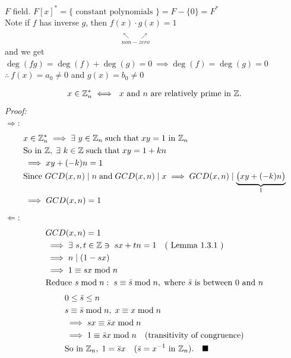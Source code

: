 \begin{example}
    $F$ field. $F[x]^* = \{\text{ constant polynomials }\} = F-\{0\}=F^*$ \\ \steezybreak
    \noindent Note if $f$ has inverse $g$, then
    $\underset{\substack{\ \\ \nwarrow \ \ \ \ \ \ \ \nearrow \\ non-zero}}{f(x)\cdot g(x)}=1$ \\
    \noindent and we get $\deg(fg)=\deg(f)+\deg(g)=0 \ \implies \deg(f)=\deg(g)=0$ \\
\noindent $\therefore \ f(x)=a_0 \neq 0$ and $g(x)=b_0 \neq 0$ \\
\end{example}
\newpage
\begin{proposition}
    \begin{align}
        x\in {\mathbb{Z}}_n^* \iff \ x \text{ and } n \text{ are relatively prime in }{\mathbb{Z}}. \nonumber
    \end{align}
    \textit{Proof:}\\
    \noindent $\Rightarrow :$
    \begin{align*}
        &x \in {\mathbb{Z}}_n^* \implies \exists \ y \in {\mathbb{Z}}_n \; \text{such that} \; xy =1 \text{ in }{\mathbb{Z}}_n \\
        &\text{So in } {\mathbb{Z}}, \; \exists \ k \in {\mathbb{Z}} \; \text{such that} \; xy = 1 + kn \\
        &\implies xy + (-k)n = 1 \\
        &\text{Since } GCD(x, n) \mid n \; \text{and} \; GCD(x, n) \mid x \implies GCD(x, n) \mid \underbrace{\big(xy + (-k)n\big)}_{1} \\
        &\implies GCD(x, n) = 1
    \end{align*}
    $\Leftarrow :$
    \begin{align*}
        &GCD(x, n) = 1 \\
        &\implies \exists \ s, t \in {\mathbb{Z}} \ni \; sx + tn = 1 \quad \text{( Lemma 1.3.1 )} \\
        &\implies n \mid (1 - sx) \\
        &\implies 1 \equiv sx \bmod n \\
        &\text{Reduce } s \bmod n: \; s \equiv \bar{s} \bmod n, \; \text{where } \bar{s} \text{ is between } 0 \text{ and } n
    \end{align*}
    \begin{align*}
        &0 \leq \bar{s} \leq n \\
        &s \equiv \bar{s} \bmod n, \; x \equiv x \bmod n \\
        &\implies sx \equiv \bar{s}x \bmod n  \\
        &\implies 1\equiv \bar{s}x \bmod n \quad \text{(transitivity of congruence)} \\
        &\text{So in } {\mathbb{Z}}_n, \; 1 = \bar{s}x \ \ \ (\bar{s}=x^{-1} \text{ in }{\mathbb{Z}}_n) . \ \ \ \blacksquare
    \end{align*}
\end{proposition}
